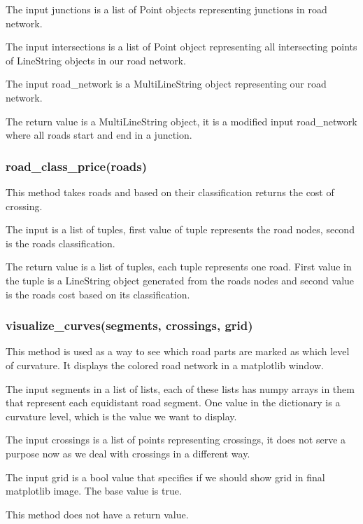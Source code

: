\documentclass[oneside]{article}
\begin{document}
            The input junctions is a list of Point objects representing junctions in road network.

            The input intersections is a list of Point object representing all intersecting points of LineString objects in our road network.

            The input road\_network is a MultiLineString object representing our road network.

            The return value is a MultiLineString object, it is a modified input road\_network where all roads start and end in a junction.

            \subsubsection{road\_class\_price(roads)}
            This method takes roads and based on their classification returns the cost of crossing.

            The input is a list of tuples, first value of tuple represents the road nodes, second is the roads classification.

            The return value is a list of tuples, each tuple represents one road. First value in the tuple is a LineString object generated from the roads nodes and second value is the roads cost based on its classification.

            \subsubsection{visualize\_curves(segments, crossings, grid)}
            This method is used as a way to see which road parts are marked as which level of curvature. It displays the colored road network in a matplotlib window.
            
            The input segments in a list of lists, each of these lists has numpy arrays in them that represent each equidistant road segment. One value in the dictionary is a curvature level, which is the value we want to display.

            The input crossings is a list of points representing crossings, it does not serve a purpose now as we deal with crossings in a different way.

            The input grid is a bool value that specifies if we should show grid in final matplotlib image. The base value is true.

            This method does not have a return value.
\end{document}
